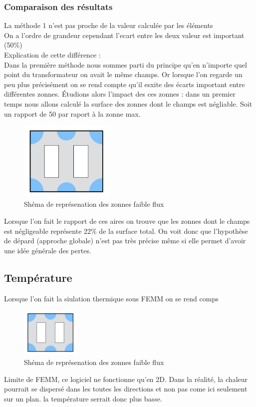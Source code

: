 

\subsubsection{Comparaison des résultats}

La méthode 1 n'est pas proche de la valeur calculée par les éléments\\
On a l'ordre de grandeur cependant l'ecart entre les deux valeur est important (50\%)\\

Explication de cette différence : \\
Dans la première méthode nous sommes parti du principe qu'en n'importe quel point du transformateur on avait le même champs. Or lorsque l'on regarde un peu plus précisément on se rend compte qu'il esxite des écarts important entre différentes zonnes.
Étudions alors l'impact des ces zonnes : dans un premier temps nous allons calculé la surface des zonnes dont le champs est négliable. Soit un rapport de 50 par raport à la zonne max.

\begin{figure}[ht]
	\begin{center}
	\includegraphics[width=0.4\textwidth]{images/TP3_zones_mortes}
	\caption{Shéma de représenation des zonnes faible flux}\label{img:RepChamps}
	\end{center}
\end{figure}
\FloatBarrier

Lorsque l'on fait le rapport de ces aires on trouve que les zonnes dont le champs est négligeable représente 22\% de la surface total. On voit donc que l'hypothèse de dépard (approche globale) n'est pas très précise même si elle permet d'avoir une idée générale des pertes.


\subsection{Température}

Lorsque l'on fait la siulation thermique sous FEMM on se rend comps 
\begin{figure}[ht]
	\begin{center}
	\includegraphics[width=0.25\textwidth]{images/TP3_zones_mortes}
	\caption{Shéma de représenation des zonnes faible flux}\label{img:RepChamps}
	\end{center}
\end{figure}

Limite de FEMM, ce logiciel ne fonctionne qu'en 2D. Dans la réalité, la chaleur pourrait se dispersé dans les toutes les directions et non pas come ici seulement sur un plan. la température serrait donc plus basse. 
